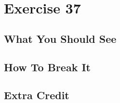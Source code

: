 \chapter{Exercise 37}


\section{What You Should See}


\section{How To Break It}


\section{Extra Credit}



